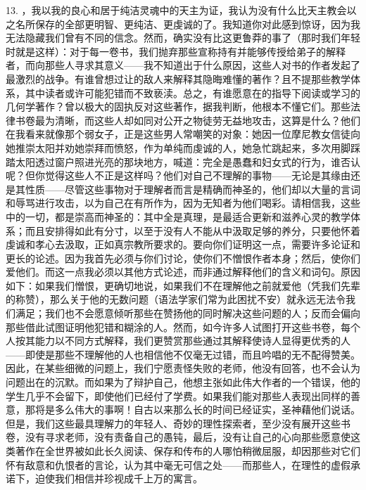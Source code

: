 13. ，我以我的良心和居于纯洁灵魂中的天主为证，我认为没有什么比天主教会以之名所保存的全部更明智、更纯洁、更虔诚的了。我知道你对此感到惊讶，因为我无法隐藏我们曾有不同的信念。然而，确实没有比这更鲁莽的事了（那时我们年轻时就是这样）：对于每一卷书，我们抛弃那些宣称持有并能够传授给弟子的解释者，而向那些人寻求其意义——我不知道出于什么原因，这些人对书的作者发起了最激烈的战争。有谁曾想过让的敌人来解释其隐晦难懂的著作？且不提那些教学体系，其中读者或许可能犯错而不致亵渎。总之，有谁愿意在的指导下阅读或学习的几何学著作？曾以极大的固执反对这些著作，据我判断，他根本不懂它们。那些法律书卷最为清晰，而这些人却如同对公开之物徒劳无益地攻击，这算是什么？他们在我看来就像那个弱女子，正是这些男人常嘲笑的对象：她因一位摩尼教女信徒向她推崇太阳并劝她崇拜而愤怒，作为单纯而虔诚的人，她急忙跳起来，多次用脚踩踏太阳透过窗户照进光亮的那块地方，喊道：完全是愚蠢和妇女式的行为，谁否认呢？但你觉得这些人不正是这样吗？他们对自己不理解的事物——无论是其缘由还是其性质——尽管这些事物对于理解者而言是精确而神圣的，他们却以大量的言词和辱骂进行攻击，以为自己在有所作为，因为无知者为他们喝彩。请相信我，这些中的一切，都是崇高而神圣的：其中全是真理，是最适合更新和滋养心灵的教学体系；而且安排得如此有分寸，以至于没有人不能从中汲取足够的养分，只要他怀着虔诚和孝心去汲取，正如真宗教所要求的。要向你们证明这一点，需要许多论证和更长的论述。因为我首先必须与你们讨论，使你们不憎恨作者本身；然后，使你们爱他们。而这一点我必须以其他方式论述，而非通过解释他们的含义和词句。原因如下：如果我们憎恨，更确切地说，如果我们不在理解他之前就爱他（凭我们先辈的称赞），那么关于他的无数问题（语法学家们常为此困扰不安）就永远无法令我们满足；我们也不会愿意倾听那些在赞扬他的同时解决这些问题的人；反而会偏向那些借此试图证明他犯错和糊涂的人。然而，如今许多人试图打开这些书卷，每个人按其能力以不同方式解释，我们更赞赏那些通过其解释使诗人显得更优秀的人——即使是那些不理解他的人也相信他不仅毫无过错，而且吟唱的无不配得赞美。因此，在某些细微的问题上，我们宁愿责怪失败的老师，他没有回答，也不会认为问题出在的沉默。而如果为了辩护自己，他想主张如此伟大作者的一个错误，他的学生几乎不会留下，即使他们已经付了学费。如果我们能对那些人表现出同样的善意，那将是多么伟大的事啊！自古以来那么长的时间已经证实，圣神藉他们说话。但是，我们这些最具理解力的年轻人、奇妙的理性探索者，至少没有展开这些书卷，没有寻求老师，没有责备自己的愚钝，最后，没有让自己的心向那些愿意使这类著作在全世界被如此长久阅读、保存和传布的人哪怕稍微屈服，却因那些对它们怀有敌意和仇恨者的言论，认为其中毫无可信之处——而那些人，在理性的虚假承诺下，迫使我们相信并珍视成千上万的寓言。\par

